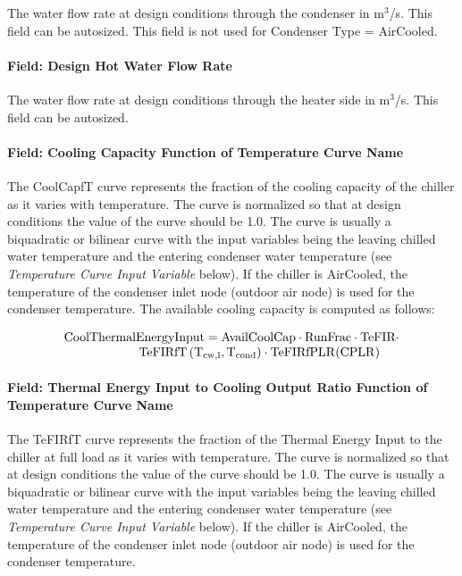 The water flow rate at design conditions through the condenser in m\(^{3}\)/s. This field can be autosized. This field is not used for Condenser Type = AirCooled.

\paragraph{Field: Design Hot Water Flow Rate}\label{field-design-hot-water-flow-rate-1}

The water flow rate at design conditions through the heater side in m\(^{3}\)/s. This field can be autosized.

\paragraph{Field: Cooling Capacity Function of Temperature Curve Name}\label{field-cooling-capacity-function-of-temperature-curve-name-3}

The CoolCapfT curve represents the fraction of the cooling capacity of the chiller as it varies with temperature. The curve is normalized so that at design conditions the value of the curve should be 1.0. The curve is usually a biquadratic or bilinear curve with the input variables being the leaving chilled water temperature and the entering condenser water temperature (see \emph{Temperature Curve Input Variable} below). If the chiller is AirCooled, the temperature of the condenser inlet node (outdoor air node) is used for the condenser temperature. The available cooling capacity is computed as follows:

\begin{equation}
    \begin{array}{l}
        \rm{CoolThermalEnergyInput} = \rm{AvailCoolCap} \cdot \rm{RunFrac} \cdot \rm{TeFIR} \cdot \\
        \quad \quad \quad \quad \quad \quad \rm{TeFIRfT} \left( T_{cw,l}, T_{cond} \right) \cdot \rm{TeFIRfPLR}( \rm{CPLR} )
    \end{array}
\end{equation}

\paragraph{Field: Thermal Energy Input to Cooling Output Ratio Function of Temperature Curve Name}\label{field-thermal-energy-input-to-cooling-output-ratio-function-of-temperature-curve-name}

The TeFIRfT curve represents the fraction of the Thermal Energy Input to the chiller at full load as it varies with temperature. The curve is normalized so that at design conditions the value of the curve should be 1.0. The curve is usually a biquadratic or bilinear curve with the input variables being the leaving chilled water temperature and the entering condenser water temperature (see \emph{Temperature Curve Input Variable} below). If the chiller is AirCooled, the temperature of the condenser inlet node (outdoor air node) is used for the condenser temperature.

